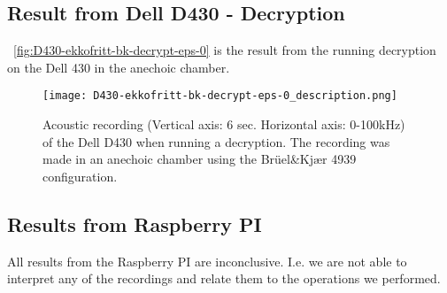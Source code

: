 \subsection{Result from Dell D430 - Decryption}\label{chp5:subsec:d430_bk_results_cpuload}

~\autoref{fig:D430-ekkofritt-bk-decrypt-eps-0} is the result from the running decryption on the Dell 430 in the anechoic chamber. 
\begin{figure}[ht]
    \centering
    \texttt{[image: D430-ekkofritt-bk-decrypt-eps-0\_description.png]}
    \caption{Acoustic recording (Vertical axis: 6 sec. Horizontal axis: 0-100kHz) of the Dell D430 when running a decryption. The recording was made in an anechoic chamber using the Brüel\&Kjær 4939 configuration.}
    \label{fig:D430-ekkofritt-bk-decrypt-eps-0}
\end{figure}

\subsection{Results from Raspberry PI}\label{chp5:subsec:rb_bk_results}
All results from the Raspberry PI are inconclusive. 
I.e. we are not able to interpret any of the recordings and relate them to the operations we performed.
